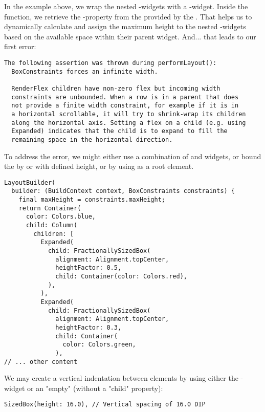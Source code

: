 \noindent In the example above, we wrap the nested -widgets with a -widget. Inside the 
 function, we retrieve the -property from the  provided by the . 
That helps us to dynamically calculate and assign the maximum height to the nested -widgets based on the 
available space within their parent widget. And... that leads to our first error: 

\begin{lstlisting}[language=terminal]
The following assertion was thrown during performLayout():
  BoxConstraints forces an infinite width.

  RenderFlex children have non-zero flex but incoming width 
  constraints are unbounded. When a row is in a parent that does 
  not provide a finite width constraint, for example if it is in 
  a horizontal scrollable, it will try to shrink-wrap its children 
  along the horizontal axis. Setting a flex on a child (e.g. using 
  Expanded) indicates that the child is to expand to fill the 
  remaining space in the horizontal direction.
\end{lstlisting}

\noindent To address the error, we might either use a combination of  and  widgets,
or bound the  by  or  with defined height, or by using  as a root 
element.

\begin{lstlisting}
LayoutBuilder(
  builder: (BuildContext context, BoxConstraints constraints) {
    final maxHeight = constraints.maxHeight;
    return Container(
      color: Colors.blue,
      child: Column(
        children: [
          Expanded(
            child: FractionallySizedBox(
              alignment: Alignment.topCenter,
              heightFactor: 0.5,
              child: Container(color: Colors.red),
            ),
          ),
          Expanded(
            child: FractionallySizedBox(
              alignment: Alignment.topCenter,
              heightFactor: 0.3,
              child: Container(
                color: Colors.green,
              ),
// ... other content
\end{lstlisting}

\noindent We may create a vertical indentation between elements by using either the -widget or an "empty" 
 (without a "child" property):

\begin{lstlisting}
SizedBox(height: 16.0), // Vertical spacing of 16.0 DIP
\end{lstlisting}

